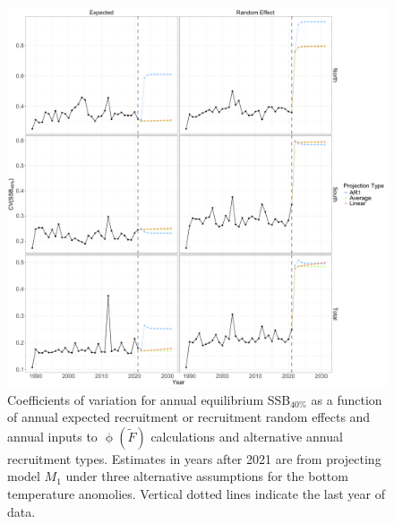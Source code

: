 \documentclass[
]{article}
\begin{document}
\begin{figure}

{\centering \includegraphics[height=0.95\textheight]{proj_SSB40_CV} 

}

\caption{Coefficients of variation for annual equilibrium SSB$_{40\%}$ as a function of annual expected recruitment or recruitment random effects and annual inputs to $\upphi(\widetilde{F})$ calculations and alternative annual recruitment types. Estimates in years after 2021 are from projecting model $M_1$ under three alternative assumptions for the bottom temperature anomolies. Vertical dotted lines indicate the last year of data.}\label{fig:annual-SSB40-cvs}
\end{figure}
\end{document}
